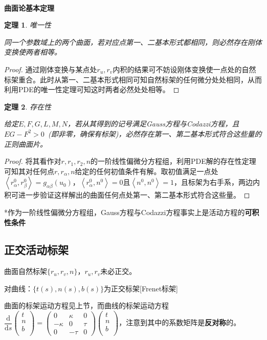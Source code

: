 \documentclass[a4paper,UTF8,fontset=windows]{ctexart}
\newtheorem{thm}{定理}[section]
\begin{document}
\

\textbf{曲面论基本定理}

\begin{thm} 唯一性

同一个参数域上的两个曲面，若对应点第一、二基本形式都相同，则必然存在刚体变换使两者相等。
\end{thm}

\begin{proof}
通过刚体变换与某点处$r_u,r_v$内积的结果可不妨设刚体变换使一点处的自然标架重合。此时从第一、二基本形式相同可知自然标架的任何微分处处相同，从而利用PDE的唯一性定理可知这时两者必然处处相等。
\end{proof}

\begin{thm} 存在性

给定$E,F,G,L,M,N$，若从其得到的记号满足Gauss方程与Codazzi方程，且$EG-F^2>0$\ (即非零，确保有标架)，必然存在第一、第二基本形式符合这些量的正则曲面片。
\end{thm}

\begin{proof}
将其看作对$r,r_1,r_2,n$的一阶线性偏微分方程组，利用PDE解的存在性定理可知其对任何点$r,r_\alpha,n$给定的任何初值条件有解。取初值满足一点处$\left<r_\alpha^0,r_\beta^0\right>=g_{\alpha\beta}(u_0)$，$\left<r_\alpha^0,n^0\right>=0$且$\left<n^0,n^0\right>=1$，且标架为右手系，两边内积可进一步验证这样解出的曲面任何点处第一、第二基本形式符合这些量。
\end{proof}

*作为一阶线性偏微分方程组，Gauss方程与Codazzi方程事实上是活动方程的\textbf{可积性条件}

\subsection{正交活动标架}

曲面自然标架$\{r_u,r_v,n\}$，$r_u,r_v$未必正交。

对曲线：$\{t(s),n(s),b(s)\}$为正交标架[Frenet标架]

曲面的标架运动方程见上节，而曲线的标架运动方程$\dfrac{\mathrm{d}}{\mathrm{d}s}\begin{pmatrix}t\\n\\b\\\end{pmatrix}=\begin{pmatrix}0&\kappa&0\\-\kappa&0&\tau\\0&-\tau&0\end{pmatrix}\begin{pmatrix}t\\n\\b\\\end{pmatrix}$，注意到其中的系数矩阵是\textbf{反对称}的。
\end{document}
